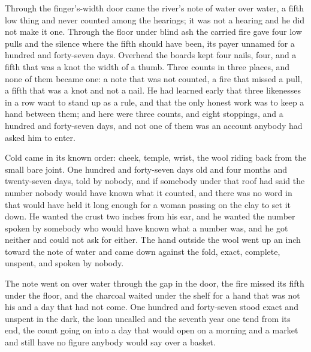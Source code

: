 \scenebreak

Through the finger's-width door came the river's note of water over water, a fifth low thing and never counted among the hearings; it was not a hearing and he did not make it one. Through the floor under blind ash the carried fire gave four low pulls and the silence where the fifth should have been, its payer unnamed for a hundred and forty-seven days. Overhead the boards kept four nails, four, and a fifth that was a knot the width of a thumb. Three counts in three places, and none of them became one: a note that was not counted, a fire that missed a pull, a fifth that was a knot and not a nail. He had learned early that three likenesses in a row want to stand up as a rule, and that the only honest work was to keep a hand between them; and here were three counts, and eight stoppings, and a hundred and forty-seven days, and not one of them was an account anybody had asked him to enter.

Cold came in its known order: cheek, temple, wrist, the wool riding back from the small bare joint. One hundred and forty-seven days old and four months and twenty-seven days, told by nobody, and if somebody under that roof had said the number nobody would have known what it counted, and there was no word in  that would have held it long enough for a woman passing on the clay to set it down. He wanted the crust two inches from his ear, and he wanted the number spoken by somebody who would have known what a number was, and he got neither and could not ask for either. The hand outside the wool went up an inch toward the note of water and came down against the fold, exact, complete, unspent, and spoken by nobody.

The note went on over water through the gap in the door, the fire missed its fifth under the floor, and the charcoal waited under the shelf for a hand that was not his and a day that had not come. One hundred and forty-seven stood exact and unspent in the dark, the loan uncalled and the seventh year one tend from its end, the count going on into a day that would open on a morning and a market and still have no figure anybody would say over a basket.
